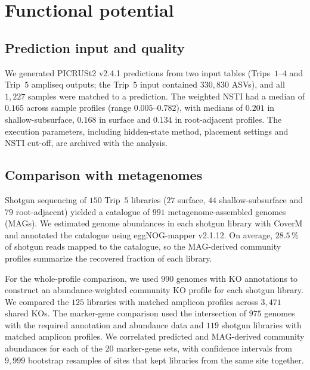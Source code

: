 \documentclass[11pt]{article}
\begin{document}


\section{Functional potential}\label{sup:function}

\subsection{Prediction input and quality}\label{sup:function_prediction}
We generated PICRUSt2 v2.4.1 predictions from two input tables (Trips~$1$--$4$ and Trip~$5$ ampliseq outputs; the Trip~$5$ input contained $330{,}830$ ASVs), and all $1{,}227$ samples were matched to a prediction. The weighted NSTI had a median of $0.165$ across sample profiles (range $0.005$--$0.782$), with medians of $0.201$ in shallow-subsurface, $0.168$ in surface and $0.134$ in root-adjacent profiles. The execution parameters, including hidden-state method, placement settings and NSTI cut-off, are archived with the analysis.


\subsection{Comparison with metagenomes}\label{sup:function_validation}
Shotgun sequencing of $150$ Trip~$5$ libraries ($27$ surface, $44$ shallow-subsurface and $79$ root-adjacent) yielded a catalogue of $991$ metagenome-assembled genomes (MAGs). We estimated genome abundances in each shotgun library with CoverM and annotated the catalogue using eggNOG-mapper v2.1.12. On average, $28.5\,\%$ of shotgun reads mapped to the catalogue, so the MAG-derived community profiles summarize the recovered fraction of each library.

For the whole-profile comparison, we used $990$ genomes with KO annotations to construct an abundance-weighted community KO profile for each shotgun library. We compared the $125$ libraries with matched amplicon profiles across $3{,}471$ shared KOs. The marker-gene comparison used the intersection of $975$ genomes with the required annotation and abundance data and $119$ shotgun libraries with matched amplicon profiles. We correlated predicted and MAG-derived community abundances for each of the $20$ marker-gene sets, with confidence intervals from $9{,}999$ bootstrap resamples of sites that kept libraries from the same site together.
\end{document}
